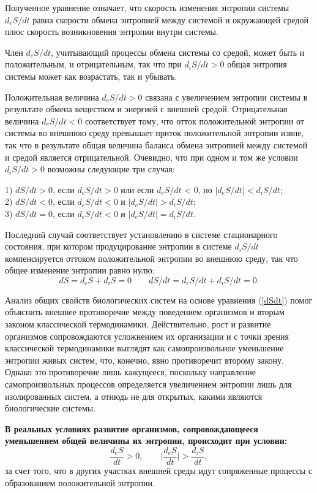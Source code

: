 \documentclass[12pt,a4paper,oneside]{book}
\begin{document}
Полученное уравнение означает, что скорость изменения энтропии системы $d_eS /dt$ равна скорости обмена энтропией между системой и окружающей средой плюс скорость возникновения энтропии внутри системы.

Член $d_eS /dt$, учитывающий процессы обмена системы со средой, может быть и положительным, и отрицательным, так что при $d_iS /dt > 0$ общая энтропия системы может как возрастать, так и убывать.

Положительная величина $d_eS /dt > 0 $ связана с увеличением энтропии системы в результате обмена веществом и энергией с внешней средой. Отрицательная величина $d_eS /dt < 0$ соответствует тому, что отток положительной энтропии от системы во внешнюю среду превышает приток положительной энтропии извне, так что в результате общая величина баланса обмена энтропией между системой и средой является отрицательной. Очевидно, что при одном и том же условии $d_iS /dt > 0$ возможны следующие три случая:

1) $dS/dt > 0$,		если $d_eS / dt> 0$ 	или если $d_eS / dt$ < 0,	но $|d_eS / dt| < d_iS /dt$;\\
2) $dS/dt < 0$,		если $d_eS / dt < 0$		и $|d_eS / dt| > d_iS /dt$;\\
3) $dS/dt = 0$,		если $d_eS / dt < 0$		и $|d_eS / dt| = d_iS /dt$.

Последний случай соответствует установлению в системе стационарного состояния, при котором продуцирование энтропии в системе $d_iS /dt$ компенсируется оттоком положительной энтропии во внешнюю среду, так что общее изменение энтропии равно нулю:
\begin{equation}
	\label{dSdt0}
	dS = d_e S + d_i S = 0 \qquad dS/dt = d_e S / dt + d_i S / dt = 0.
\end{equation}

Анализ общих свойств биологических систем на основе уравнения (\ref{dSdt}) помог объяснить внешнее противоречие между поведением организмов и вторым законом классической термодинамики. Действительно, рост и развитие организмов сопровождаются усложнением их организации и с точки зрения классической термодинамики выглядят как самопроизвольное уменьшение энтропии живых систем, что, конечно, явно противоречит второму закону. Однако это противоречие лишь кажущееся, поскольку направление самопроизвольных процессов определяется увеличением энтропии лишь для изолированных систем, а отнюдь не для открытых, какими являются биологические системы.

\textbf{В реальных условиях развитие организмов, сопровождающееся уменьшением общей величины их энтропии, происходит при условии:}
\begin{equation}
	\frac{d_e S }{dt} > 0, \qquad \vert\frac{d_e S }{dt}\vert >  \frac{d_i S }{dt},
\end{equation}
за счет того, что в других участках внешней среды идут сопряженные процессы с образованием положительной энтропии.
\end{document}

